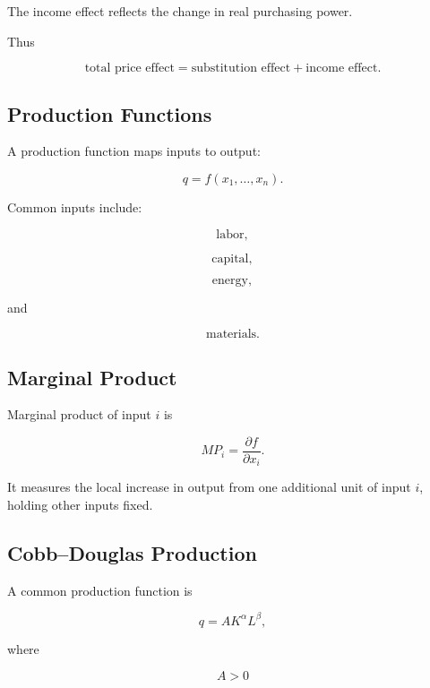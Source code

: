 The income effect reflects the change in real purchasing power.

Thus

\[
\boxed{
\text{total price effect}
=
\text{substitution effect}
+
\text{income effect}.
}
\]

\subsection{Production Functions}
\label{subsec:production-functions}

A production function maps inputs to output:

\[
\boxed{
q
=
f(x_1,\ldots,x_n).
}
\]

Common inputs include:

\[
\boxed{
\text{labor},
}
\]

\[
\boxed{
\text{capital},
}
\]

\[
\boxed{
\text{energy},
}
\]

and

\[
\boxed{
\text{materials}.
}
\]

\subsection{Marginal Product}
\label{subsec:marginal-product}

Marginal product of input \(i\) is

\[
\boxed{
MP_i
=
\frac{\partial f}{\partial x_i}.
}
\]

It measures the local increase in output from one additional unit of input
\(i\), holding other inputs fixed.

\subsection{Cobb--Douglas Production}
\label{subsec:cobb-douglas-production}

A common production function is

\[
\boxed{
q
=
AK^\alpha L^\beta,
}
\]

where

\[
A>0
\]

